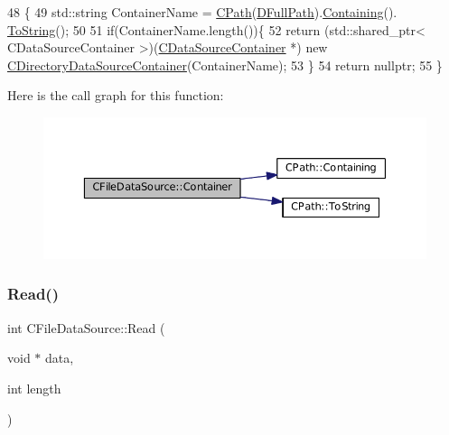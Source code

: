 \begin{DoxyCode}
48                                                                 \{
49     std::string ContainerName = \hyperlink{classCPath}{CPath}(\hyperlink{classCFileDataSource_acf4e0d3f7c32cae09f91b7530e490aea}{DFullPath}).\hyperlink{classCPath_a24d8c455b1663ce251d3a749437fa4fe}{Containing}().
      \hyperlink{classCPath_abbafaf377a7e38e0151bd9567d526951}{ToString}();
50     
51     \textcolor{keywordflow}{if}(ContainerName.length())\{
52         \textcolor{keywordflow}{return} (std::shared\_ptr< CDataSourceContainer >)(\hyperlink{classCDataSourceContainer}{CDataSourceContainer} *) \textcolor{keyword}{new} 
      \hyperlink{classCDirectoryDataSourceContainer}{CDirectoryDataSourceContainer}(ContainerName);
53     \}
54     \textcolor{keywordflow}{return} \textcolor{keyword}{nullptr};
55 \}
\end{DoxyCode}
Here is the call graph for this function\+:\nopagebreak
\begin{figure}[H]
\begin{center}
\leavevmode
\includegraphics[width=350pt]{classCFileDataSource_a2492b88ea8186c4cbd4bdfa92060f5fa_cgraph}
\end{center}
\end{figure}
\hypertarget{classCFileDataSource_a97b9c7b8904aecbe7b0e8797508265fd}{}\label{classCFileDataSource_a97b9c7b8904aecbe7b0e8797508265fd} 
\subsubsection{\texorpdfstring{Read()}{Read()}}
{\footnotesize\ttfamily int C\+File\+Data\+Source\+::\+Read (\begin{DoxyParamCaption}\item[{void $\ast$}]{data,  }\item[{int}]{length }\end{DoxyParamCaption})\hspace{0.3cm}{\ttfamily [virtual]}}



